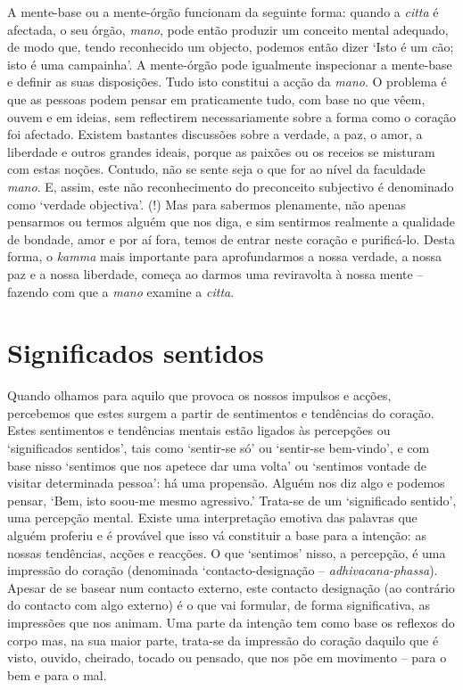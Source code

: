 A mente-base ou a mente-órgão funcionam da seguinte forma: quando a \emph{citta}
é afectada, o seu órgão, \emph{mano}, pode então produzir um conceito mental
adequado, de modo que, tendo reconhecido um objecto, podemos então dizer `Isto é
um cão; isto é uma campainha'. A mente-órgão pode igualmente inspecionar a
mente-base e definir as suas disposições. Tudo isto constitui a acção da
\emph{mano}. O problema é que as pessoas podem pensar em praticamente tudo, com
base no que vêem, ouvem e em ideias, sem reflectirem necessariamente sobre a
forma como o coração foi afectado. Existem bastantes discussões sobre a verdade,
a paz, o amor, a liberdade e outros grandes ideais, porque as paixões ou os
receios se misturam com estas noções. Contudo, não se sente seja o que for ao
nível da faculdade \emph{mano}. E, assim, este não reconhecimento do preconceito
subjectivo é denominado como `verdade objectiva'. (!) Mas para sabermos
plenamente, não apenas pensarmos ou termos alguém que nos diga, e sim sentirmos
realmente a qualidade de bondade, amor e por aí fora, temos de entrar neste
coração e purificá-lo. Desta forma, o \emph{kamma} mais importante para
aprofundarmos a nossa verdade, a nossa paz e a nossa liberdade, começa ao darmos
uma reviravolta à nossa mente -- fazendo com que a \emph{mano} examine a
\emph{citta}.

\section{Significados sentidos}

Quando olhamos para aquilo que provoca os nossos impulsos e acções, percebemos
que estes surgem a partir de sentimentos e tendências do coração. Estes
sentimentos e tendências mentais estão ligados às percepções ou `significados
sentidos', tais como `sentir-se só' ou `sentir-se bem-vindo', e com base nisso
`sentimos que nos apetece dar uma volta' ou `sentimos vontade de visitar
determinada pessoa': há uma propensão. Alguém nos diz algo e podemos pensar,
`Bem, isto soou-me mesmo agressivo.' Trata-se de um `significado sentido', uma
percepção mental. Existe uma interpretação emotiva das palavras que alguém
proferiu e é provável que isso vá constituir a base para a intenção: as nossas
tendências, acções e reacções. O que `sentimos' nisso, a percepção, é uma
impressão do coração (denominada `contacto-designação --
\emph{adhivacana-phassa}). Apesar de se basear num contacto externo, este
contacto designação (ao contrário do contacto com algo externo) é o que vai
formular, de forma significativa, as impressões que nos animam. Uma parte da
intenção tem como base os reflexos do corpo mas, na sua maior parte, trata-se da
impressão do coração daquilo que é visto, ouvido, cheirado, tocado ou pensado,
que nos põe em movimento -- para o bem e para o mal.

